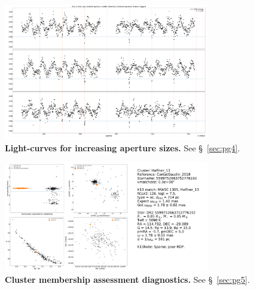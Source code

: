 \documentclass[12pt,twocolumn,tighten]{aastex62}
\begin{document}
\begin{figure}[!h]
	\begin{center}
		\leavevmode
		\includegraphics[width=0.8\textwidth]{gaiatwo0005599752663752776192-0007_page04.pdf}
	\end{center}
	\vspace{-0.5cm}
	\caption{
		{\bf Light-curves for increasing aperture sizes.}  See
    \S~\ref{sec:pg4}.
		\label{fig:pg4}
	}
\end{figure}

\begin{figure}[!h]
	\begin{center}
		\leavevmode
		\includegraphics[width=0.8\textwidth]{gaiatwo0005599752663752776192-0007_page05.pdf}
	\end{center}
	\vspace{-0.5cm}
	\caption{
		{\bf Cluster membership assessment diagnostics.} See
    \S~\ref{sec:pg5}.
		\label{fig:pg5}
	}
\end{figure}
\end{document}
